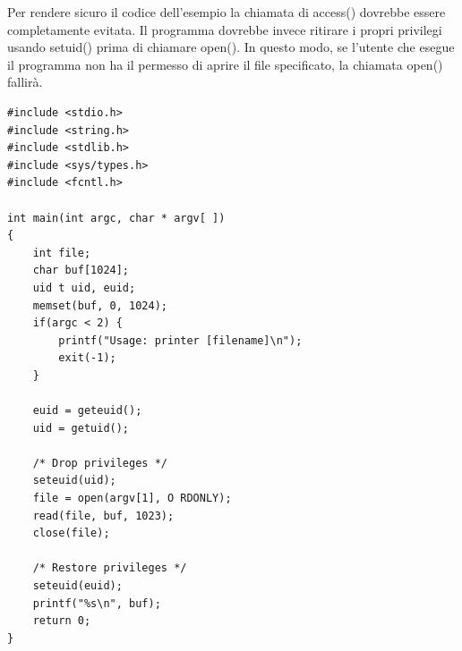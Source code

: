Per rendere sicuro il codice dell'esempio la chiamata di access() dovrebbe essere
completamente evitata. Il programma dovrebbe invece ritirare i propri privilegi usando setuid() prima di chiamare open(). In questo modo, se l'utente che esegue il programma non ha il permesso di aprire il file specificato, la chiamata open() fallirà.
\begin{algorithm}
\begin{lstlisting}[caption={Esempio codice sicuro}]
#include <stdio.h>
#include <string.h>
#include <stdlib.h>
#include <sys/types.h>
#include <fcntl.h>

int main(int argc, char * argv[ ])
{
	int file;
	char buf[1024];
	uid t uid, euid;
	memset(buf, 0, 1024);
	if(argc < 2) {
		printf("Usage: printer [filename]\n");
		exit(-1);
	}
	
	euid = geteuid();
	uid = getuid();
	
	/* Drop privileges */
	seteuid(uid);
	file = open(argv[1], O RDONLY);
	read(file, buf, 1023);
	close(file);

	/* Restore privileges */
	seteuid(euid);
	printf("%s\n", buf);
	return 0;
}
\end{lstlisting}
\end{algorithm}
